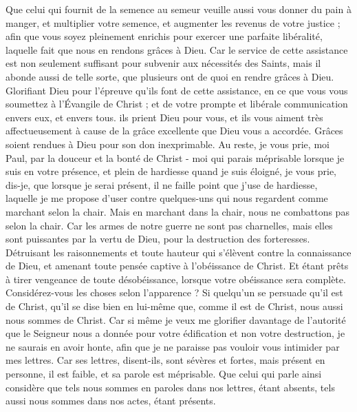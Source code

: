 \begin{multicols}{2}
Que celui qui fournit de la semence au semeur veuille aussi vous donner du pain à manger, et multiplier votre semence, et augmenter les revenus de votre justice ;
afin que vous soyez pleinement enrichis pour exercer une parfaite libéralité, laquelle fait que nous en rendons grâces à Dieu.
Car le service de cette assistance est non seulement suffisant pour subvenir aux nécessités des Saints, mais il abonde aussi de telle sorte, que plusieurs ont de quoi en rendre grâces à Dieu.
Glorifiant Dieu pour l’épreuve qu’ils font de cette assistance, en ce que vous vous soumettez à l’Évangile de Christ ; et de votre prompte et libérale communication envers eux, et envers tous.
ils prient Dieu pour vous, et ils vous aiment très affectueusement à cause de la grâce excellente que Dieu vous a accordée.
Grâces soient rendues à Dieu pour son don inexprimable.
\VerseOne{}Au reste, je vous prie, moi Paul, par la douceur et la bonté de Christ - moi qui parais méprisable lorsque je suis en votre présence, et plein de hardiesse quand je suis éloigné,
je vous prie, dis-je, que lorsque je serai présent, il ne faille point que j'use de hardiesse, laquelle je me propose d’user contre quelques-uns qui nous regardent comme marchant selon la chair.
Mais en marchant dans la chair, nous ne combattons pas selon la chair.
Car les armes de notre guerre ne sont pas charnelles, mais elles sont puissantes par la vertu de Dieu, pour la destruction des forteresses.
Détruisant les raisonnements et toute hauteur qui s'élèvent contre la connaissance de Dieu, et amenant toute pensée captive à l'obéissance de Christ.
Et étant prêts à tirer vengeance de toute désobéissance, lorsque votre obéissance sera complète.
Considérez-vous les choses selon l'apparence ? Si quelqu'un se persuade qu’il est de Christ, qu'il se dise bien en lui-même que, comme il est de Christ, nous aussi nous sommes de Christ.
Car si même je veux me glorifier davantage de l’autorité que le Seigneur nous a donnée pour votre édification et non votre destruction, je ne saurais en avoir honte,
afin que je ne paraisse pas vouloir vous intimider par mes lettres.
Car ses lettres, disent-ils, sont sévères et fortes, mais présent en personne, il est faible, et sa parole est méprisable.
Que celui qui parle ainsi considère que tels nous sommes en paroles dans nos lettres, étant absents, tels aussi nous sommes dans nos actes, étant présents.

\end{multicols}
